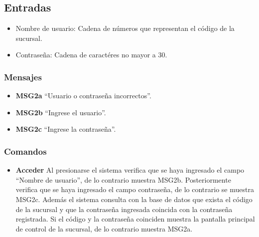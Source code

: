 \documentclass[]{article}
\begin{document}
\subsection{Entradas}
\begin{itemize}
	\item Nombre de usuario: Cadena de números que representan el código de la sucursal. 
	\item Contraseña: Cadena de caractéres no mayor a 30.
\end{itemize}

\subsubsection{Mensajes}
\begin{itemize}
	\item {\bf MSG2a} ``Usuario o contraseña incorrectos''.
	\item {\bf MSG2b} ``Ingrese el usuario''.
	\item {\bf MSG2c} ``Ingrese la contraseña''.
\end{itemize}

\subsubsection{Comandos}
\begin{itemize}
	\item {\bf Acceder} Al presionarse el sistema verifica que se haya ingresado el campo ``Nombre de usuario'', de lo contrario muestra MSG2b. Posteriormente verifica que se haya ingresado el campo contraseña, de lo contrario se muestra MSG2c. Además el sistema consulta con la base de datos que exista el código de la sucursal y que la contraseña ingresada coincida con la contraseña registrada. Si el código y la contraseña coinciden muestra la pantalla principal de control de la sucursal, de lo contrario muestra MSG2a.
\end{itemize}
\end{document}
